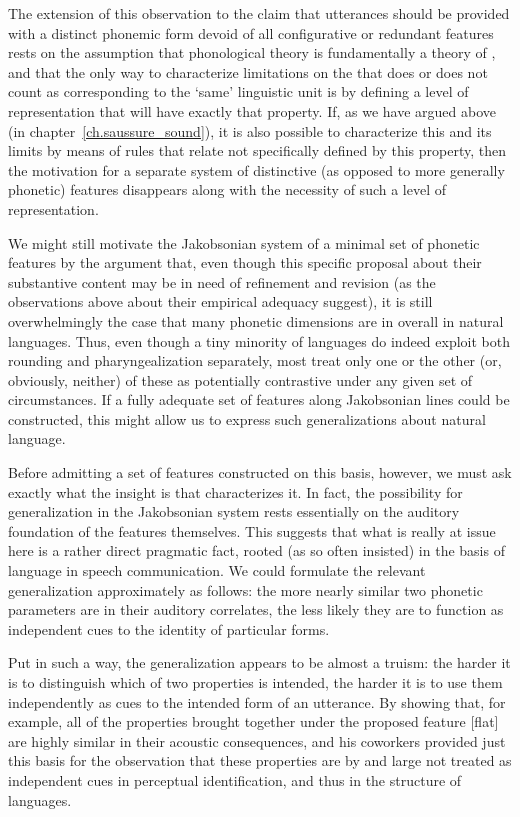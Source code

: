 The extension of this observation to the claim that utterances should
be provided with a distinct phonemic form devoid of all configurative
or redundant features rests on the assumption that phonological theory
is fundamentally a theory of , and that the only way to
characterize limitations on the  that does or does not count
as corresponding to the `same' linguistic unit is by defining a level
of representation that will have exactly that property. If, as we have
argued above (in chapter~\ref{ch.saussure_sound}), it is also possible
to characterize this  and its limits by means of rules that
relate  not specifically defined by this property, then
the motivation for a separate system of distinctive (as opposed to
more generally phonetic) features disappears along with the necessity
of such a level of representation.

We might still motivate the Jakobsonian system of a minimal set of
phonetic features by the argument that, even though this specific
proposal about their substantive content may be in need of refinement
and revision (as the observations above about their empirical adequacy
suggest), it is still overwhelmingly the case that many phonetic
dimensions are in overall  in natural
languages. Thus, even though a tiny minority of languages do indeed
exploit both rounding and pharyngealization separately, most treat
only one or the other (or, obviously, neither) of these as potentially
contrastive under any given set of circumstances. If a fully adequate
set of features along Jakobsonian lines could be constructed, this
might allow us to express such generalizations about natural language.

Before admitting a set of features constructed on this basis, however,
we must ask exactly what the insight is that characterizes it. In
fact, the possibility for generalization in the Jakobsonian system
rests essentially on the auditory foundation of the features
themselves. This suggests that what is really at issue here is a
rather direct pragmatic fact, rooted (as {\Jakobson} so often insisted)
in the basis of language in speech communication. We could formulate
the relevant generalization approximately as follows: the more nearly
similar two phonetic parameters are in their auditory correlates, the
less likely they are to function as independent cues to the identity
of particular forms.

Put in such a way, the generalization appears to be almost a truism:
the harder it is to distinguish which of two properties is intended,
the harder it is to use them independently as cues to the intended
form of an utterance. By showing that, for example, all of the
properties brought together under the proposed feature [flat] are
highly similar in their acoustic consequences, {\Jakobson} and his
coworkers provided just this basis for the observation that these
properties are by and large not treated as independent cues in
perceptual identification, and thus in the structure of languages.

